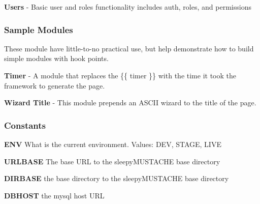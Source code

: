 \begin{DoxyItemize}
\item {\bfseries Users} -\/ Basic user and roles functionality includes auth, roles, and permissions
\end{DoxyItemize}

\subsubsection*{Sample Modules}

These module have little-\/to-\/no practical use, but help demonstrate how to build simple modules with hook points.


\begin{DoxyItemize}
\item {\bfseries Timer} -\/ A module that replaces the \{\{ timer \}\} with the time it took the framework to generate the page.
\end{DoxyItemize}


\begin{DoxyItemize}
\item {\bfseries Wizard Title} -\/ This module prepends an A\-S\-C\-I\-I wizard to the title of the page.
\end{DoxyItemize}

\subsubsection*{Constants}


\begin{DoxyItemize}
\item {\bfseries E\-N\-V} What is the current environment. Values\-: D\-E\-V, S\-T\-A\-G\-E, L\-I\-V\-E
\end{DoxyItemize}


\begin{DoxyItemize}
\item {\bfseries U\-R\-L\-B\-A\-S\-E} The base U\-R\-L to the sleepy\-M\-U\-S\-T\-A\-C\-H\-E base directory
\end{DoxyItemize}


\begin{DoxyItemize}
\item {\bfseries D\-I\-R\-B\-A\-S\-E} the base directory to the sleepy\-M\-U\-S\-T\-A\-C\-H\-E base directory
\end{DoxyItemize}


\begin{DoxyItemize}
\item {\bfseries D\-B\-H\-O\-S\-T} the mysql host U\-R\-L
\end{DoxyItemize}


